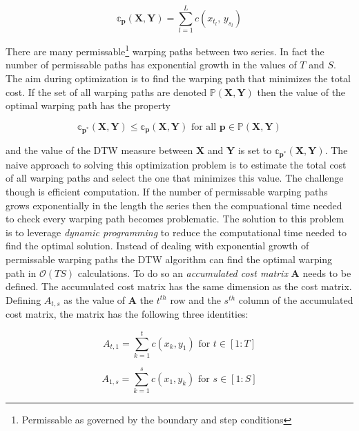 \documentclass[12pt]{article}
\begin{document}
\begin{equation}
    \mathbb{c}_{\boldsymbol{p}}(\boldsymbol{X}, \boldsymbol{Y}) = \sum^{L}_{l=1} c(x_{t_{l}},\, y_{s_{l}})
\end{equation}

There are many permissable\footnote{Permissable as governed by the boundary and step conditions} warping paths between two series. In fact the number of permissable paths has exponential growth in the values of $T$ and $S$. The aim during optimization is to find the warping path that minimizes the total cost. If the set of all warping paths are denoted $\mathbb{P}(\boldsymbol{X}, \boldsymbol{Y})$ then the value of the optimal warping path has the property

\begin{equation}
    \mathbb{c}_{\boldsymbol{p}^{*}}(\boldsymbol{X}, \boldsymbol{Y}) \le \mathbb{c}_{\boldsymbol{p}}(\boldsymbol{X}, \boldsymbol{Y}) \,\, \textrm{for all} \,\, \boldsymbol{p} \in \mathbb{P}(\boldsymbol{X}, \boldsymbol{Y})
\end{equation}

and the value of the DTW measure between $\boldsymbol{X}$ and $\boldsymbol{Y}$ is set to $\mathbb{c}_{\boldsymbol{p^{*}}}(\boldsymbol{X}, \boldsymbol{Y})$. The naive approach to solving this optimization problem is to estimate the total cost of all warping paths and select the one that minimizes this value. The challenge though is efficient computation. If the number of permissable warping paths grows exponentially in the length the series then the compuational time needed to check every warping path becomes problematic. The solution to this problem is to leverage \emph{dynamic programming} to reduce the computational time needed to find the optimal solution. Instead of dealing with exponential growth of permissable warping paths the DTW algorithm can find the optimal warping path in $\mathcal{O}(TS)$ calculations. To do so an \emph{accumulated cost matrix} $\boldsymbol{A}$ needs to be defined. The accumulated cost matrix has the same dimension as the cost matrix. Defining $A_{t,s}$ as the value of $\boldsymbol{A}$ the $t^{th}$ row and the $s^{th}$ column of the accumulated cost matrix, the matrix has the following three identities:

\begin{equation}
    A_{t,1} = \sum^{t}_{k=1} c(x_{k}, y_{1}) \,\, \textrm{for} \,\, t \in [1:T]
\end{equation}

\begin{equation}
    A_{1,s} = \sum^{s}_{k=1} c(x_{1}, y_{k}) \,\, \textrm{for} \,\, s \in [1:S]
\end{equation}
\end{document}
